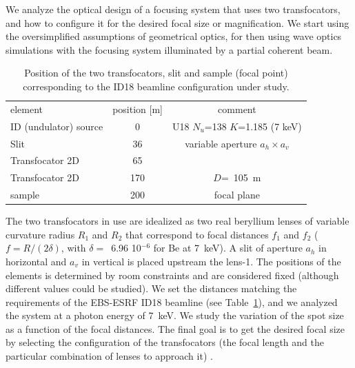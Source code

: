 \documentclass{iucr}              %
\begin{document}
We analyze the optical design of a focusing system that uses two transfocators, and how to configure it for the desired focal size or magnification. We start using the oversimplified assumptions of geometrical optics, for then using wave optics simulations with the focusing system illuminated by a partial coherent beam.

\begin{table}[]
    \label{table:id18parameters}
    \caption{Position of the two transfocators, slit and sample (focal point) corresponding to the ID18 beamline configuration under study. }
    \centering
    \begin{tabular}{l|c|c}
         element & position [m] & comment\\
         ID (undulator) source& 0 & U18 $N_u$=138 $K$=1.185 (7 keV)\\
         Slit & 36 &
         variable aperture $a_h\times a_v$
         \\
         Transfocator 2D & 65 & 
         \\
         Transfocator 2D & 170 & $D$=~\SI{105}{\meter} \\
         sample & 200 & focal plane
    \end{tabular}


\end{table}

The two transfocators in use are idealized as two real beryllium lenses of variable curvature radius $R_1$ and $R_2$ that correspond to focal distances $f_1$ and $f_2$ ($f=R/(2 \delta)$, with $\delta=$~6.96 10$^{-6}$ for Be at \SI{7}{keV}). A slit of aperture $a_h$ in horizontal and $a_v$ in vertical is placed upstream the lens-1. The positions of the elements is determined by room constraints and are considered fixed (although different values could be studied). We set the distances matching the requirements of the EBS-ESRF ID18 beamline (see Table~\ref{table:id18parameters}), and we analyzed the system at a photon energy of \SI{7}{keV}. We study the variation of the spot size as a function of the focal distances. The final goal is to get the desired focal size by selecting the configuration of the transfocators (the focal length and the particular combination of lenses to approach it) . 
\end{document}
